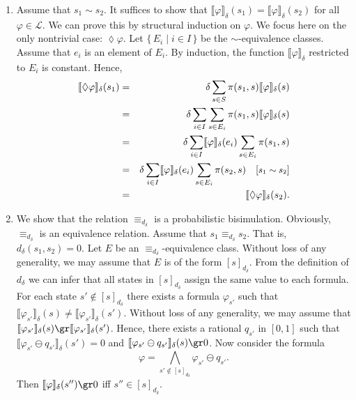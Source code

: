 \documentclass{LMCS}
\newcommand{\interpretation}[1]{\llbracket #1 \rrbracket_{\delta}}
\newcommand{\comment}[1]{\hspace{1em}\mbox{[{\small #1}]}}
\newcommand{\modality}{\lozenge}
\begin{document}
\begin{enumerate}[$\bullet$]
\item
Assume that $s_1 \sim s_2$.  It suffices to show that
$\interpretation{\varphi}(s_1) = \interpretation{\varphi}(s_2)$
for all $\varphi \in \mathcal{L}$.  We can prove this by structural induction
on $\varphi$.  We focus here on the only nontrivial case: 
$\modality \varphi$.
Let $\{\, E_i \mid i \in I \,\}$ be the $\sim$-equivalence
classes.  Assume that $e_i$ is an element of $E_i$.
By induction, the function $\interpretation{\varphi}$
restricted to $E_i$ is constant.  Hence,
\begin{eqnarray*}
\interpretation{\modality \varphi}(s_1)
& = & \delta \sum_{s \in S} \pi(s_1, s) \interpretation{\varphi}(s)\\
& = & \delta \sum_{i \in I} \sum_{s \in E_i} \pi(s_1, s) \interpretation{\varphi}(s)\\
& = & \delta \sum_{i \in I} \interpretation{\varphi}(e_i) \sum_{s \in E_i} \pi(s_1, s)\\
& = & \delta \sum_{i \in I} \interpretation{\varphi}(e_i) \sum_{s \in E_i} \pi(s_2, s)
\comment{$s_1 \sim s_2$}\\
& = & \interpretation{\modality \varphi}(s_2).
\end{eqnarray*}
\item
We show that the relation $\equiv_{d_{\delta}}$ 
is a probabilistic bisimulation.  Obviously, $\equiv_{d_{\delta}}$ is
an equivalence relation.  Assume that $s_1 \mathbin{\equiv_{d_{\delta}}} s_2$.
That is, $d_{\delta}(s_1, s_2) = 0$.  Let $E$ be an $\equiv_{d_{\delta}}$-equivalence
class.  Without loss of any generality, we may assume that $E$ is of
the form $[s]_{d_{\delta}}$.  From the definition of $d_{\delta}$ we can infer that
all states in $[s]_{d_{\delta}}$ assign
the same value to each formula.  For each state $s' \not\in [s]_{d_{\delta}}$
there exists a formula $\varphi_{s'}$ such that 
$\interpretation{\varphi_{s'}}(s) \not= \interpretation{\varphi_{s'}}(s')$.
Without loss of any generality, we may assume that 
$\interpretation{\varphi_{s'}}(s) \gr \interpretation{\varphi_{s'}}(s')$.
Hence, there exists a rational $q_{s'}$ in $[0, 1]$ such that
$\interpretation{\varphi_{s'} \ominus q_{s'}}(s') = 0$ and
$\interpretation{\varphi_{s'} \ominus q_{s'}}(s) \gr 0$. 
Now consider the formula
\begin{displaymath}
\varphi = \bigwedge_{s' \not\in [s]_{d_{\delta}}} \varphi_{s'} \ominus q_{s'}.
\end{displaymath}
Then $\interpretation{\varphi}(s'') \gr 0$ iff $s'' \in [s]_{d_{\delta}}$.

\end{enumerate}
\end{document}
